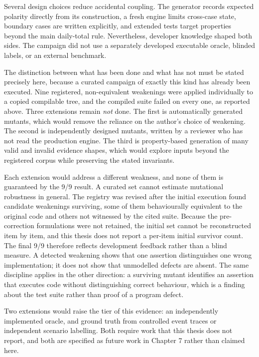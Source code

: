 Several design choices reduce accidental coupling. The generator records expected polarity directly from its construction, a fresh engine limits cross-case state, boundary cases are written explicitly, and extended tests target properties beyond the main daily-total rule. Nevertheless, developer knowledge shaped both sides. The campaign did not use a separately developed executable oracle, blinded labels, or an external benchmark.

The distinction between what has been done and what has not must be stated precisely here, because a curated campaign of exactly this kind has already been executed. Nine registered, non-equivalent weakenings were applied individually to a copied compilable tree, and the compiled suite failed on every one, as reported above. Three extensions remain \emph{not} done. The first is automatically generated mutants, which would remove the reliance on the author's choice of weakening. The second is independently designed mutants, written by a reviewer who has not read the production engine. The third is property-based generation of many valid and invalid evidence shapes, which would explore inputs beyond the registered corpus while preserving the stated invariants.

Each extension would address a different weakness, and none of them is guaranteed by the 9/9 result. A curated set cannot estimate mutational robustness in general. The registry was revised after the initial execution found candidate weakenings surviving, some of them behaviourally equivalent to the original code and others not witnessed by the cited suite. Because the pre-correction formulations were not retained, the initial set cannot be reconstructed item by item, and this thesis does not report a per-item initial survivor count. The final 9/9 therefore reflects development feedback rather than a blind measure. A detected weakening shows that one assertion distinguishes one wrong implementation; it does not show that unmodelled defects are absent. The same discipline applies in the other direction: a surviving mutant identifies an assertion that executes code without distinguishing correct behaviour, which is a finding about the test suite rather than proof of a program defect.

Two extensions would raise the tier of this evidence: an independently implemented oracle, and ground truth from controlled event traces or independent scenario labelling. Both require work that this thesis does not report, and both are specified as future work in Chapter 7 rather than claimed here.

